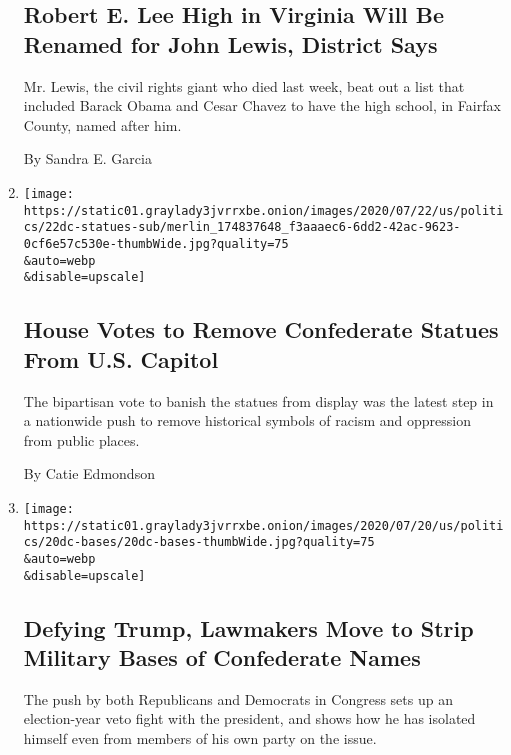 \begin{enumerate}
{  \subsection{Robert E. Lee High in Virginia Will Be Renamed for John
  Lewis, District
  Says}\label{robert-e-lee-high-in-virginia-will-be-renamed-for-john-lewis-district-says}}

  Mr. Lewis, the civil rights giant who died last week, beat out a list
  that included Barack Obama and Cesar Chavez to have the high school,
  in Fairfax County, named after him.

  By Sandra E. Garcia
\item
  \href{/2020/07/22/us/politics/confederate-statues-us-capitol.html}{}

  \texttt{[image: https://static01.graylady3jvrrxbe.onion/images/2020/07/22/us/politics/22dc-statues-sub/merlin\_174837648\_f3aaaec6-6dd2-42ac-9623-0cf6e57c530e-thumbWide.jpg?quality=75\\\&auto=webp\\\&disable=upscale]}

  \hypertarget{house-votes-to-remove-confederate-statues-from-us-capitol}{%
  \subsection{House Votes to Remove Confederate Statues From U.S.
  Capitol}\label{house-votes-to-remove-confederate-statues-from-us-capitol}}

  The bipartisan vote to banish the statues from display was the latest
  step in a nationwide push to remove historical symbols of racism and
  oppression from public places.

  By Catie Edmondson
\item
  \href{/2020/07/20/us/politics/congress-trump-confederate-base-names.html}{}

  \texttt{[image: https://static01.graylady3jvrrxbe.onion/images/2020/07/20/us/politics/20dc-bases/20dc-bases-thumbWide.jpg?quality=75\\\&auto=webp\\\&disable=upscale]}

  \hypertarget{defying-trump-lawmakers-move-to-strip-military-bases-of-confederate-names}{%
  \subsection{Defying Trump, Lawmakers Move to Strip Military Bases of
  Confederate
  Names}\label{defying-trump-lawmakers-move-to-strip-military-bases-of-confederate-names}}

  The push by both Republicans and Democrats in Congress sets up an
  election-year veto fight with the president, and shows how he has
  isolated himself even from members of his own party on the issue.


\end{enumerate}
